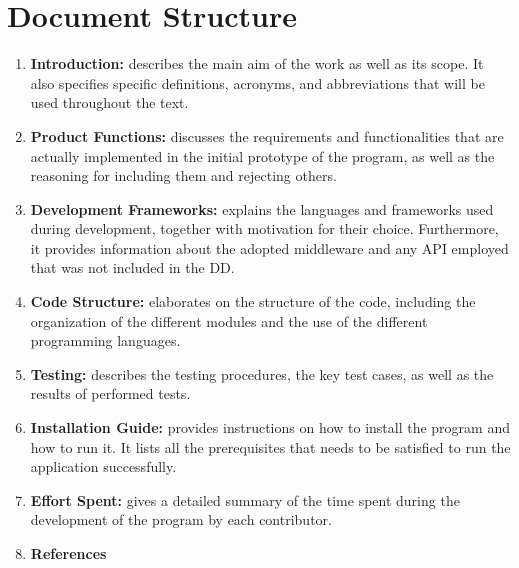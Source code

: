 \printbibliography[title={Reference Documents}, keyword=intro, heading=subbibnumbered]

\section{Document Structure}

\begin{enumerate}
    \item \textbf{Introduction:} describes the main aim of the work as well as its scope. It also specifies specific definitions, acronyms, and abbreviations that will be used throughout the text.
    \item \textbf{Product Functions:} discusses the requirements and functionalities that are actually implemented in the initial prototype of the program, as well as the reasoning for including them and rejecting others.
    \item \textbf{Development Frameworks:} explains the languages and frameworks used during development, together with motivation for their choice. Furthermore, it provides information about the adopted middleware and any API employed that was not included in the DD.
    \item \textbf{Code Structure:} elaborates on the structure of the code, including the organization of the different modules and the use of the different programming languages.
    \item \textbf{Testing:} describes the testing procedures, the key test cases, as well as the results of performed tests.
    \item \textbf{Installation Guide:} provides instructions on how to install the program and how to run it. It lists all the prerequisites that needs to be satisfied to run the application successfully.
    \item \textbf{Effort Spent:} gives a detailed summary of the time spent during the development of the program by each contributor.
    \item \textbf{References}
\end{enumerate}
